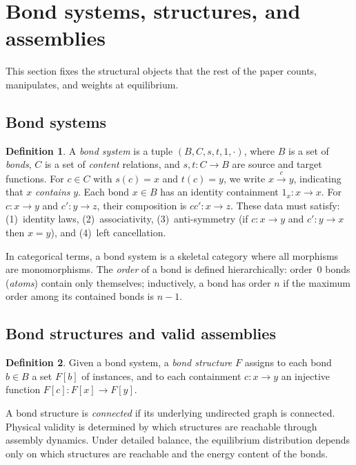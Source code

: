 \documentclass[11pt]{amsart}
\theoremstyle{definition}
\newtheorem{definition}{Definition}
\theoremstyle{plain}
\theoremstyle{remark}
\begin{document}
\section{Bond systems, structures, and assemblies}
\label{sec:formalism}

This section fixes the structural objects that the rest of the paper counts, manipulates, and weights at equilibrium.

\subsection{Bond systems}

\begin{definition}
A \emph{bond system} is a tuple $(B,C,s,t,1,\cdot)$, where $B$ is a set of \emph{bonds}, $C$ is a set of \emph{content} relations, and $s,t:C\to B$ are source and target functions.
For $c\in C$ with $s(c)=x$ and $t(c)=y$, we write $x\xrightarrow{c}y$, indicating that $x$ \emph{contains} $y$.
Each bond $x\in B$ has an identity containment $1_x:x\to x$.
For $c:x\to y$ and $c':y\to z$, their composition is $cc':x\to z$.
These data must satisfy: (1)~identity laws, (2)~associativity, (3)~anti-symmetry (if $c:x\to y$ and $c':y\to x$ then $x=y$), and (4)~left cancellation.
\end{definition}

In categorical terms, a bond system is a skeletal category where all morphisms are monomorphisms.
The \emph{order} of a bond is defined hierarchically: order~0 bonds (\emph{atoms}) contain only themselves; inductively, a bond has order $n$ if the maximum order among its contained bonds is $n-1$.

\subsection{Bond structures and valid assemblies}

\begin{definition}
Given a bond system, a \emph{bond structure} $F$ assigns to each bond $b\in B$ a set $F[b]$ of instances, and to each containment $c:x\to y$ an injective function $F[c]:F[x]\to F[y]$.
\end{definition}

A bond structure is \emph{connected} if its underlying undirected graph is connected.
Physical validity is determined by which structures are reachable through assembly dynamics.
Under detailed balance, the equilibrium distribution depends only on which structures are reachable and the energy content of the bonds.
\end{document}
